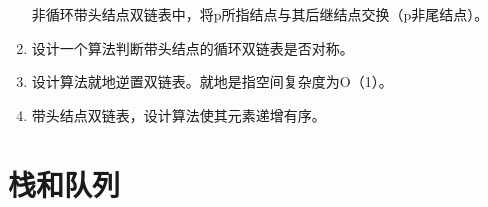 \documentclass[lang=cn,newtx,10pt,scheme=chinese]{../../elegantbook}
\begin{document}
\begin{enumerate}
  非循环带头结点双链表中，将p所指结点与其后继结点交换（p非尾结点）。
  
\vspace{5cm}
\item
  
  设计一个算法判断带头结点的循环双链表是否对称。
  
\vspace{5cm}
\item
  
  设计算法就地逆置双链表。就地是指空间复杂度为O（1）。
  
\vspace{5cm}
\item
  
  带头结点双链表，设计算法使其元素递增有序。
  
\end{enumerate}

  \chapter{栈和队列}
\end{document}
